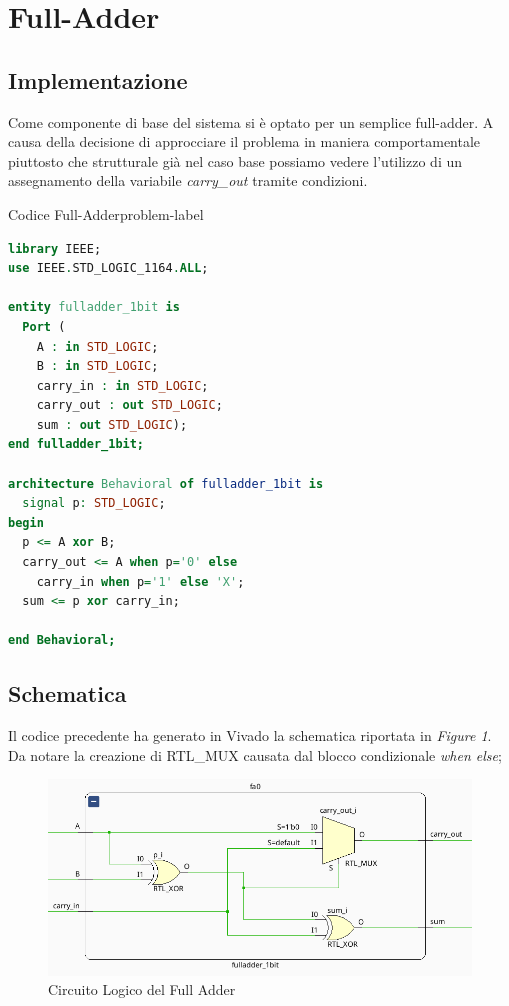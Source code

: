 \section{Full-Adder}
\subsection{Implementazione}
Come componente di base del sistema si è optato per un semplice full-adder. A causa della decisione di approcciare il problema in maniera comportamentale piuttosto che strutturale già nel caso base possiamo vedere l'utilizzo di un assegnamento della variabile \textit{carry\_out} tramite condizioni.

\begin{problem}{Codice Full-Adder}{problem-label}
\begin{lstlisting}[language=VHDL]
library IEEE;
use IEEE.STD_LOGIC_1164.ALL;

entity fulladder_1bit is
  Port ( 
    A : in STD_LOGIC;
    B : in STD_LOGIC;
    carry_in : in STD_LOGIC;
    carry_out : out STD_LOGIC;
    sum : out STD_LOGIC);
end fulladder_1bit;

architecture Behavioral of fulladder_1bit is
  signal p: STD_LOGIC;
begin
  p <= A xor B;
  carry_out <= A when p='0' else
    carry_in when p='1' else 'X';
  sum <= p xor carry_in;

end Behavioral;

\end{lstlisting}
\end{problem}
\newpage
\subsection{Schematica}
Il codice precedente ha generato in Vivado la schematica riportata in \textit{Figure 1}. Da notare la creazione di RTL\_MUX causata dal blocco condizionale \textit{when else};

\begin{figure}[h]
    \centering
    \includegraphics[width=15cm]{resources/fulladder.png}
    \caption{Circuito Logico del Full Adder}
    \label{fig:logic_circuit_fulladder}
\end{figure}


